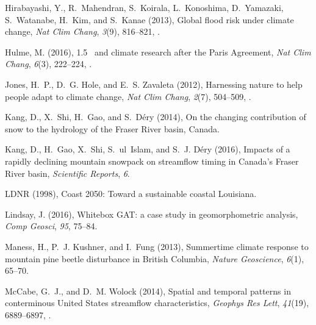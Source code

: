 \documentclass{AGUJournal}
\begin{document}
\begin{thebibliography}{38}
Hirabayashi, Y., R.~Mahendran, S.~Koirala, L.~Konoshima, D.~Yamazaki,
  S.~Watanabe, H.~Kim, and S.~Kanae (2013), Global flood risk under climate
  change, \textit{Nat Clim Chang}, \textit{3}(9), 816--821,
  .

Hulme, M. (2016), 1.5\celsius~ and climate research after the {Paris
  Agreement}, \textit{Nat Clim Chang}, \textit{6}(3), 222--224,
  .

Jones, H.~P., D.~G. Hole, and E.~S. Zavaleta (2012), Harnessing nature to help
  people adapt to climate change, \textit{Nat Clim Chang}, \textit{2}(7),
  504--509, .

Kang, D., X.~Shi, H.~Gao, and S.~D{\'e}ry (2014), On the changing contribution
  of snow to the hydrology of the {F}raser {R}iver basin, {C}anada.

Kang, D., H.~Gao, X.~Shi, S.~ul~Islam, and S.~J. D{\'e}ry (2016), Impacts of
		a rapidly declining mountain snowpack on streamflow timing in {C}anada{'}s
  {Fraser River} basin, \textit{Scientific {R}eports}, \textit{6}.

LDNR (1998), Coast 2050: Toward a sustainable coastal {L}ouisiana.

Lindsay, J. (2016), Whitebox {GAT:} a case study in geomorphometric analysis,
  \textit{Comp Geosci}, \textit{95}, 75--84.

Maness, H., P.~J. Kushner, and I.~Fung (2013), Summertime climate response to
  mountain pine beetle disturbance in {B}ritish {C}olumbia, \textit{Nature
  Geoscience}, \textit{6}(1), 65--70.

{McCabe}, G.~J., and D.~M. Wolock (2014), Spatial and temporal patterns in
  conterminous {U}nited {S}tates streamflow characteristics, \textit{Geophys Res
  Lett}, \textit{41}(19), 6889--6897, .


\end{thebibliography}
\end{document}
